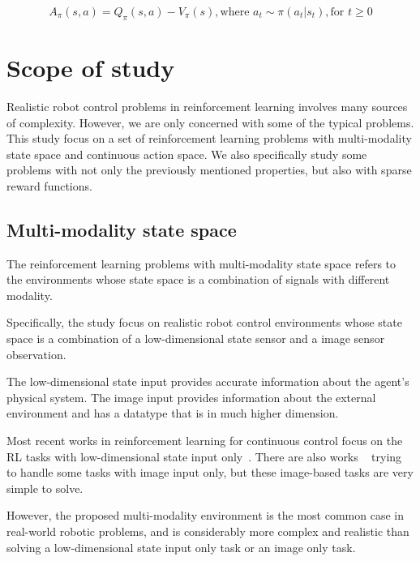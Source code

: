 $$ A_\pi (s,a) = Q_\pi (s,a) - V_\pi (s), \text{where } a_t \sim \pi (a_t|s_t), \text{for } t \geq 0 $$




\section{Scope of study}
Realistic robot control problems in reinforcement learning involves many sources of complexity. However, we are only concerned with some of the typical problems.
This study focus on a set of reinforcement learning problems with multi-modality state space and continuous action space. We also specifically study some problems with not only the previously mentioned properties, but also with sparse reward functions.
\subsection{Multi-modality state space}

The reinforcement learning problems with multi-modality state space refers to the environments whose state space is a combination of signals with different modality.

Specifically, the study focus on realistic robot control environments whose state space is a combination of a low-dimensional state sensor and a image sensor observation.

The low-dimensional state input provides accurate information about the agent's physical system. The image input provides information about the external environment and has a datatype that is in much higher dimension.

Most recent works in reinforcement learning for continuous control focus on the RL tasks with low-dimensional state input only~\cite{duan2016benchmarking}. There are also works ~\cite{wu2017scalable} trying to handle some tasks with image input only, but these image-based tasks are very simple to solve.

However, the proposed multi-modality environment is the most common case in real-world robotic problems, and is considerably more complex and realistic than solving a low-dimensional state input only task or an image only task.


